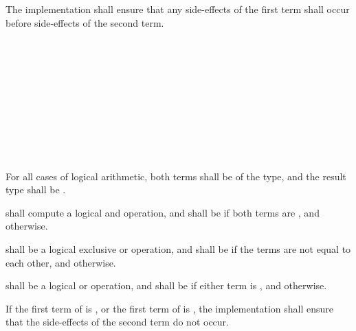 \specsubsubitem
The implementation shall ensure that any side-effects of the first term shall
occur before side-effects of the second term.


\begin{grammar}
 \\
	 \\
	 \terminal{\&\&}  \\

 \\
	 \\
	 \terminal{\textasciicircum\textasciicircum}  \\

 \\
	 \\
	 \terminal{||}  \\
\end{grammar}

\specsubsubitem
For all cases of logical arithmetic, both terms shall be of the 
type, and the result type shall be .

\specsubsubitem
\terminal{\&\&} shall compute a logical and operation, and shall be
 if both terms are , and 
otherwise.

\specsubsubitem
\terminal{\textasciicircum\textasciicircum} shall be a logical exclusive or
operation, and shall be  if the terms are not equal to each
other, and  otherwise.

\specsubsubitem
\terminal{||} shall be a logical or operation, and shall be  if
either term is , and  otherwise.

\specsubsubitem
If the first term of  is ,
or the first term of  is ,
the implementation shall ensure that the side-effects of the second term do not
occur.


